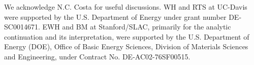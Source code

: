 \documentclass[pra,letterpaper,10pt,twocolumn]{revtex4}
\begin{document}
\begin{acknowledgements}
We acknowledge N.C. Costa for useful discussions. WH and RTS at UC-Davis were supported by the U.S. Department of Energy under grant number DE-SC0014671.  EWH and BM at Stanford/SLAC, primarily for the analytic continuation and its interpretation, were supported by the U.S. Department of Energy (DOE), Office of Basic Energy Sciences, Division of Materials Sciences and Engineering, under Contract No. DE-AC02-76SF00515.
\end{acknowledgements}
\end{document}
